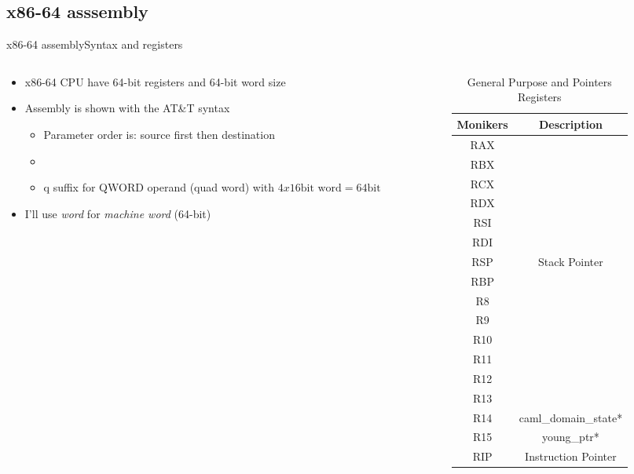 %
%
\subsection{x86-64 asssembly}

\newcommand\assemblyExample{%
}
\begin{frame}{x86-64 assembly}{Syntax and registers}
\begin{columns}[c]
\begin{column}{0.5\textwidth}
\begin{itemize}
\item x86-64 CPU have 64-bit registers and 64-bit word size
\item Assembly is shown with the AT\&T syntax
\begin{itemize}
\item Parameter order is: source first then destination
\item \inputminted{gas}{src/assembly/movq.S}
\item {}q suffix for QWORD operand (quad word) with $4 x 16\text{bit word} = 64\text{bit}$
\end{itemize}
\item I'll use \emph{word} for \emph{machine word} (64-bit)
\end{itemize}
\end{column}
\begin{column}{0.5\textwidth}
\begin{table}
\begin{tabular}{|c|c|}
\hline
Monikers & Description \\
\hline
\hline
RAX & \\
\hline
RBX & \\
\hline
RCX & \\
\hline
RDX & \\
\hline
RSI & \\
\hline
RDI & \\
\hline
RSP & Stack Pointer \\
\hline
RBP & \\
\hline
R8  & \\
\hline
R9  & \\
\hline
R10 & \\
\hline
R11 & \\
\hline
R12 & \\
\hline
R13 & \\
\hline
R14 & caml_domain_state* \\
\hline
R15 & young_ptr* \\
\hline
RIP & Instruction Pointer \\
\hline
\end{tabular}
\caption{General Purpose and Pointers Registers}
\end{table}
\end{column}
\end{columns}
\end{frame}


